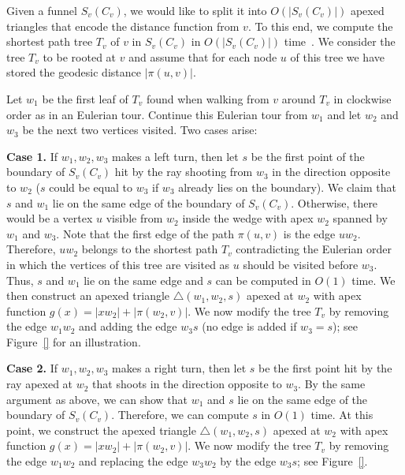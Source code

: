 \documentclass[a4paper,UKenglish]{lipics}
\newcommand{\fn}[2]{\ensuremath{S_{\scriptscriptstyle #1}(#2)}}
\newcommand{\g}[2]{\ensuremath{|\pi(#1, #2)|}}
\newcommand{\p}[2]{\ensuremath{\pi(#1, #2)}}
\begin{document}
Given a funnel $\fn{v}{C_v}$, we would like to split it into $O(|\fn{v}{C_v}|)$ apexed triangles that encode the distance function from $v$.
To this end, we compute the shortest path tree $T_v$ of $v$ in $\fn{v}{C_v}$ in $O(|\fn{v}{C_v}|)$ time~\cite{guibasShortestPathQueries}.
We consider the tree $T_v$ to be rooted at $v$ and assume that for each node $u$ of this tree 
we have stored the geodesic distance $\g{u}{v}$. 

Let $w_1$ be the first leaf of $T_v$ found when walking from $v$ around $T_v$ in clockwise order as in an Eulerian tour.
Continue this Eulerian tour from $w_1$ and let $w_2$ and $w_3$ be the next two vertices visited. Two cases arise:

\textbf{Case 1.} If $w_1, w_2, w_3$ makes a left turn, then let $s$ be the first point of the boundary of $\fn{v}{C_v}$ hit by the ray shooting from $w_3$ in the direction opposite to $w_2$ ($s$ could be equal to $w_3$ if $w_3$ already lies on the boundary).
We claim that $s$ and $w_1$ lie on the same edge of the boundary of $\fn{v}{C_v}$. 
Otherwise, there would be a vertex $u$ visible from $w_2$ inside the wedge with apex $w_2$ spanned by $w_1$ and $w_3$.
Note that the first edge of the path $\p{u}{v}$ is the edge $uw_2$. Therefore, $uw_2$ belongs to the shortest path $T_v$ contradicting the Eulerian order in which the vertices of this tree are visited as $u$ should be visited before $w_3$. Thus, $s$ and $w_1$ lie on the same edge and $s$ can be computed in $O(1)$ time.
We then construct an apexed triangle $\triangle(w_1, w_2, s)$ apexed at $w_2$ with apex function $g(x) = |x w_2| + \g{w_2}{v}$.
We now modify the tree $T_v$ by removing the edge $w_1w_2$ and adding the edge $w_3s$ (no edge is added if $w_3 = s$); see Figure~\ref{} for an illustration.

\textbf{Case 2.} If $w_1, w_2, w_3$ makes a right turn, then let $s$ be the first point hit by the ray apexed at $w_2$ that shoots in the direction opposite to $w_3$. By the same argument as above, we can show that $w_1$ and $s$ lie on the same edge of the boundary of $\fn{v}{C_v}$. Therefore, we can compute $s$ in $O(1)$ time. At this point, we construct the apexed triangle $\triangle(w_1, w_2, s)$ apexed at $w_2$ with apex function $g(x) = |x w_2| + \g{w_2}{v}$.
We now modify the tree $T_v$ by removing the edge $w_1w_2$ and replacing the edge $w_3w_2$ by the edge $w_3s$; see Figure~\ref{}.
\end{document}
